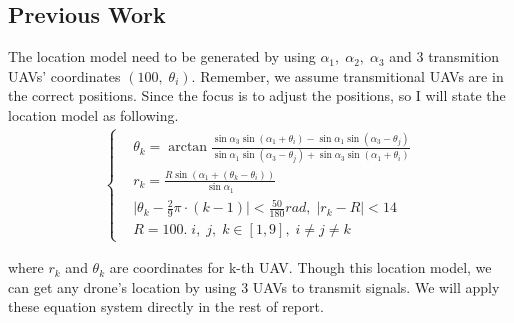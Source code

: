 \documentclass[11pt,en]{elegantpaper}
\begin{document}
\subsection{Previous Work}
The location model need to be generated by using $\alpha_1,\; \alpha_2,\; \alpha_3$ and 3 transmition UAVs' coordinates
$(100,\; \theta_i)$.
Remember, we assume transmitional UAVs are in the correct positions.
Since the focus is to adjust the positions, so I will state the location model as following.
\begin{align}
\left\{ 
    \begin{aligned}
    &\theta_k = \arctan \frac{\sin\alpha_3 \sin(\alpha_1 + \theta_i)-\sin\alpha_1 \sin(\alpha_3 -\theta_j)}{\sin\alpha_1 \sin(\alpha_3 - \theta_j)+\sin\alpha_3 \sin(\alpha_1 +\theta_i)}\\
    &r_k = \frac{R\sin(\alpha_1+(\theta_k - \theta_i))}{\sin\alpha_1}\\
    &\lvert \theta_k -\frac{2}{9}\pi \cdot(k-1) \rvert <\frac{50}{180}rad,\; \lvert r_k -R \rvert < 14\\
    &R=100.\; i,\; j,\; k\in[1,9],\;i\neq j\neq k
    \end{aligned} 
\right.
\end{align} 

where $r_k$ and $\theta_k$ are coordinates for k-th UAV. 
Though this location model, we can get any drone's location by using 3 UAVs to transmit signals.
We will apply these equation system directly in the rest of report.
\end{document}

